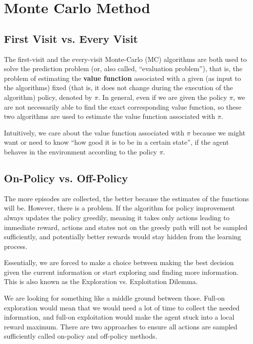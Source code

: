 \chapter{Monte Carlo Method}

\section{First Visit vs. Every Visit}
The first-visit and the every-visit Monte-Carlo (MC) algorithms are both used to solve the prediction problem (or, also called, ``evaluation problem''), that is, the problem of estimating the \textbf{value function} associated with a given (as input to the algorithms) fixed (that is, it does not change during the execution of the algorithm) policy, denoted by $\pi$. In general, even if we are given the policy $\pi$, we are not necessarily able to find the exact corresponding value function, so these two algorithms are used to estimate the value function associated with $\pi$.

Intuitively, we care about the value function associated with $\pi$ because we might want or need to know ``how good it is to be in a certain state'', if the agent behaves in the environment according to the policy $\pi$.

\section{On-Policy vs. Off-Policy}
The more episodes are collected, the better because the estimates of the functions will be. However, there is a problem. If the algorithm for policy improvement always updates the policy greedily, meaning it takes only actions leading to immediate reward, actions and states not on the greedy path will not be sampled sufficiently, and potentially better rewards would stay hidden from the learning process.

Essentially, we are forced to make a choice between making the best decision given the current information or start exploring and finding more information. This is also known as the Exploration vs. Exploitation Dilemma.

We are looking for something like a middle ground between those. Full-on exploration would mean that we would need a lot of time to collect the needed information, and full-on exploitation would make the agent stuck into a local reward maximum. There are two approaches to ensure all actions are sampled sufficiently called on-policy and off-policy methods.



